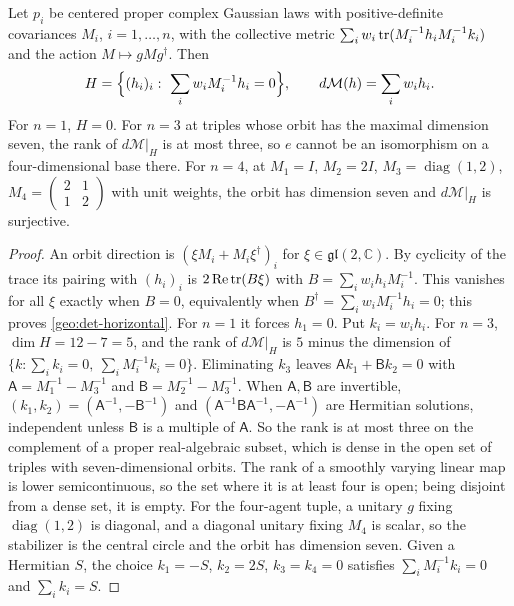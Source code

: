 Let $p_i$ be centered proper complex Gaussian laws with positive-definite covariances $M_i$, $i=1,\ldots,n$, with the collective metric $\sum_iw_i\operatorname{tr}(M_i^{-1}h_iM_i^{-1}k_i)$ and the action $M\mapsto gMg^\dagger$. Then
\begin{equation}
H=\Bigl\{(h_i)_i:\ \sum_iw_iM_i^{-1}h_i=0\Bigr\},
\qquad
d\mathcal M(h)=\sum_iw_ih_i.
\label{geo:det-horizontal}
\end{equation}
For $n=1$, $H=0$. For $n=3$ at triples whose orbit has the maximal dimension seven, the rank of $d\mathcal M|_H$ is at most three, so $e$ cannot be an isomorphism on a four-dimensional base there. For $n=4$, at $M_1=I$, $M_2=2I$, $M_3=\operatorname{diag}(1,2)$, $M_4=\begin{pmatrix}2&1\\1&2\end{pmatrix}$ with unit weights, the orbit has dimension seven and $d\mathcal M|_H$ is surjective.
\begin{proof}
An orbit direction is $(\xi M_i+M_i\xi^\dagger)_i$ for $\xi\in\mathfrak{gl}(2,\mathbb C)$. By cyclicity of the trace its pairing with $(h_i)_i$ is $2\operatorname{Re}\operatorname{tr}(B\xi)$ with $B=\sum_iw_ih_iM_i^{-1}$. This vanishes for all $\xi$ exactly when $B=0$, equivalently when $B^\dagger=\sum_iw_iM_i^{-1}h_i=0$; this proves \cref{geo:det-horizontal}. For $n=1$ it forces $h_1=0$. Put $k_i=w_ih_i$. For $n=3$, $\dim H=12-7=5$, and the rank of $d\mathcal M|_H$ is $5$ minus the dimension of $\{k:\sum_ik_i=0,\ \sum_iM_i^{-1}k_i=0\}$. Eliminating $k_3$ leaves $\mathsf Ak_1+\mathsf Bk_2=0$ with $\mathsf A=M_1^{-1}-M_3^{-1}$ and $\mathsf B=M_2^{-1}-M_3^{-1}$. When $\mathsf A,\mathsf B$ are invertible, $(k_1,k_2)=(\mathsf A^{-1},-\mathsf B^{-1})$ and $(\mathsf A^{-1}\mathsf B\mathsf A^{-1},-\mathsf A^{-1})$ are Hermitian solutions, independent unless $\mathsf B$ is a multiple of $\mathsf A$. So the rank is at most three on the complement of a proper real-algebraic subset, which is dense in the open set of triples with seven-dimensional orbits. The rank of a smoothly varying linear map is lower semicontinuous, so the set where it is at least four is open; being disjoint from a dense set, it is empty. For the four-agent tuple, a unitary $g$ fixing $\operatorname{diag}(1,2)$ is diagonal, and a diagonal unitary fixing $M_4$ is scalar, so the stabilizer is the central circle and the orbit has dimension seven. Given a Hermitian $S$, the choice $k_1=-S$, $k_2=2S$, $k_3=k_4=0$ satisfies $\sum_iM_i^{-1}k_i=0$ and $\sum_ik_i=S$.
\end{proof}

